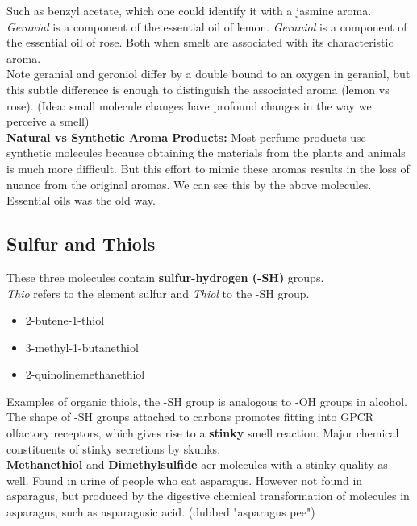 \documentclass{article}
\begin{document}
Such as benzyl acetate, which one could identify it with a jasmine aroma. \textit{Geranial} is a component of the essential oil of lemon. \textit{Geraniol} is a component of the essential oil of rose. Both when smelt are associated with its characteristic aroma. \\
Note geranial and geroniol differ by a double bound to an oxygen in geranial, but this subtle difference is enough to distinguish the associated aroma (lemon vs rose). (Idea: small molecule changes have profound changes in the way we perceive a smell) \\

\textbf{Natural vs Synthetic Aroma Products:} Most perfume products use synthetic molecules because obtaining the materials from the plants and animals is much more difficult. But this effort to mimic these aromas results in the loss of nuance from the original aromas. We can see this by the above molecules. Essential oils was the old way. \\

\subsection{Sulfur and Thiols}

These three molecules contain \textbf{sulfur-hydrogen (-SH)} groups. \\
\textit{Thio} refers to the element sulfur and \textit{Thiol} to the -SH group. 

\begin{itemize}
    \item 2-butene-1-thiol
    \item 3-methyl-1-butanethiol
    \item 2-quinolinemethanethiol
\end{itemize}

Examples of organic thiols, the -SH group is analogous to -OH groups in alcohol. The shape of -SH groups attached to carbons promotes fitting into GPCR olfactory receptors, which gives rise to a \textbf{stinky} smell reaction. Major chemical constituents of stinky secretions by skunks. \\

\textbf{Methanethiol} and \textbf{Dimethylsulfide} aer molecules with a stinky quality as well. Found in urine of people who eat asparagus. However not found in asparagus, but produced by the digestive chemical transformation of molecules in asparagus, such as asparagusic acid. (dubbed "asparagus pee") \\
\end{document}
